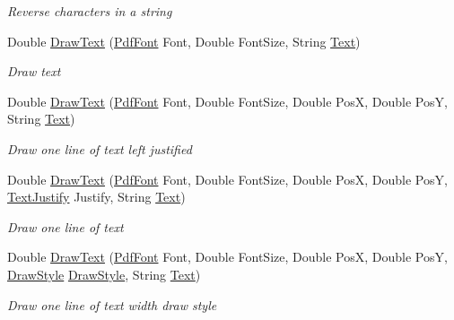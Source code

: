 \begin{DoxyCompactItemize}
\begin{DoxyCompactList}\small\item\em Reverse characters in a string \end{DoxyCompactList}\item 
Double \hyperlink{class_pdf_file_writer_1_1_pdf_contents_a5c1013939293d73770b2342f250cd2b7}{Draw\+Text} (\hyperlink{class_pdf_file_writer_1_1_pdf_font}{Pdf\+Font} Font, Double Font\+Size, String \hyperlink{namespace_pdf_file_writer_a45e52c090a4d8e1333577773ec0bac4aa9dffbf69ffba8bc38bc4e01abf4b1675}{Text})
\begin{DoxyCompactList}\small\item\em Draw text \end{DoxyCompactList}\item 
Double \hyperlink{class_pdf_file_writer_1_1_pdf_contents_a78cb8f09f51b2b7d113e32cd375c6ca6}{Draw\+Text} (\hyperlink{class_pdf_file_writer_1_1_pdf_font}{Pdf\+Font} Font, Double Font\+Size, Double PosX, Double PosY, String \hyperlink{namespace_pdf_file_writer_a45e52c090a4d8e1333577773ec0bac4aa9dffbf69ffba8bc38bc4e01abf4b1675}{Text})
\begin{DoxyCompactList}\small\item\em Draw one line of text left justified \end{DoxyCompactList}\item 
Double \hyperlink{class_pdf_file_writer_1_1_pdf_contents_a4f759883c61a7d0231954670865eb48a}{Draw\+Text} (\hyperlink{class_pdf_file_writer_1_1_pdf_font}{Pdf\+Font} Font, Double Font\+Size, Double PosX, Double PosY, \hyperlink{namespace_pdf_file_writer_a3991bfacc8c7be240452dd24ec817157}{Text\+Justify} Justify, String \hyperlink{namespace_pdf_file_writer_a45e52c090a4d8e1333577773ec0bac4aa9dffbf69ffba8bc38bc4e01abf4b1675}{Text})
\begin{DoxyCompactList}\small\item\em Draw one line of text \end{DoxyCompactList}\item 
Double \hyperlink{class_pdf_file_writer_1_1_pdf_contents_a221a99b9ed12a02bf7ef854b43e0a1d1}{Draw\+Text} (\hyperlink{class_pdf_file_writer_1_1_pdf_font}{Pdf\+Font} Font, Double Font\+Size, Double PosX, Double PosY, \hyperlink{namespace_pdf_file_writer_a2bcdd73c6cedab15d6f6c2a64333ef39}{Draw\+Style} \hyperlink{namespace_pdf_file_writer_a2bcdd73c6cedab15d6f6c2a64333ef39}{Draw\+Style}, String \hyperlink{namespace_pdf_file_writer_a45e52c090a4d8e1333577773ec0bac4aa9dffbf69ffba8bc38bc4e01abf4b1675}{Text})
\begin{DoxyCompactList}\small\item\em Draw one line of text width draw style \end{DoxyCompactList}\item 

\end{DoxyCompactItemize}
